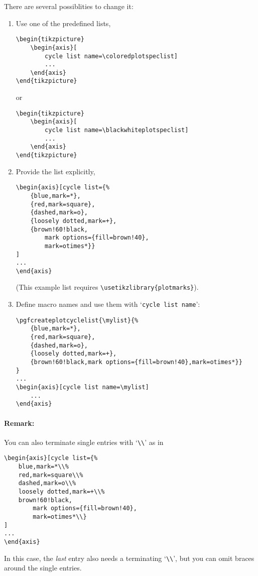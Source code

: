 There are several possiblities to change it:
\begin{enumerate}
	\item Use one of the predefined lists,
\begin{lstlisting}
\begin{tikzpicture}
	\begin{axis}[
		cycle list name=\coloredplotspeclist]
		...
	\end{axis}
\end{tikzpicture}
\end{lstlisting}
or
\begin{lstlisting}
\begin{tikzpicture}
	\begin{axis}[
		cycle list name=\blackwhiteplotspeclist]
		...
	\end{axis}
\end{tikzpicture}
\end{lstlisting}
	\item Provide the list explicitly,
\begin{lstlisting}
\begin{axis}[cycle list={%
	{blue,mark=*},
	{red,mark=square},
	{dashed,mark=o},
	{loosely dotted,mark=+},
	{brown!60!black,
		mark options={fill=brown!40},
		mark=otimes*}}
]
...
\end{axis}
\end{lstlisting}
	(This example list requires \lstinline!\usetikzlibrary{plotmarks}!).
	\item Define macro names and use them with `\texttt{cycle list name}':
\begin{lstlisting}
\pgfcreateplotcyclelist{\mylist}{%
	{blue,mark=*},
	{red,mark=square},
	{dashed,mark=o},
	{loosely dotted,mark=+},
	{brown!60!black,mark options={fill=brown!40},mark=otimes*}}
}
...
\begin{axis}[cycle list name=\mylist]
	...
\end{axis}
\end{lstlisting}
\end{enumerate}

\paragraph{Remark:} You can also terminate single entries with `\lstinline!\\!' as in
\begin{lstlisting}
\begin{axis}[cycle list={%
	blue,mark=*\\%
	red,mark=square\\%
	dashed,mark=o\\%
	loosely dotted,mark=+\\%
	brown!60!black,
		mark options={fill=brown!40},
		mark=otimes*\\}
]
...
\end{axis}
\end{lstlisting}
In this case, the \emph{last} entry also needs a terminating `\lstinline!\\!', but you can omit braces around the single entries.

